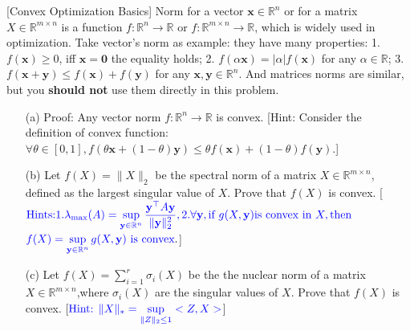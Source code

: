 \item {} [Convex Optimization Basics] Norm for a vector $\mathbf{x}\in\mathbb{R}^n$ or for a matrix $X\in\mathbb{R}^{m\times n}$ is a function $f:\mathbb{R}^{n}\rightarrow\mathbb{R}$ or $f:\mathbb{R}^{m\times n}\rightarrow\mathbb{R}$, which is widely used in optimization. Take vector's norm as example: they have many properties: 1. $f(\mathbf{x})\geq 0$, iff $\mathbf{x}=\mathbf{0}$ the equality holds; 2. $f(\alpha\mathbf{x})=|\alpha| f(\mathbf{x})$ for any $\alpha\in\mathbb{R}$; 3. $f(\mathbf{x}+\mathbf{y})\leq f(\mathbf{x})+f(\mathbf{y})$ for any $\mathbf{x},\mathbf{y}\in\mathbb{R}^n$. And matrices norms are similar, but you \textbf{should not} use them directly in this problem.
\begin{itemize}
    \item[(a)] Proof: Any vector norm $f:\mathbb{R}^{n}\rightarrow\mathbb{R}$ is convex. [Hint: Consider the definition of convex function: $\forall\theta\in[0,1], f(\theta\mathbf{x}+(1-\theta)\mathbf{y})\leq \theta f(\mathbf{x})+(1-\theta)f(\mathbf{y})$.] ~
    \item[(b)] Let $f(X) = \|X\|_2$ be the spectral norm of a matrix $X \in \mathbb{R}^{m \times n}$, defined as the largest singular value of $X$. Prove that $f(X)$ is convex. [$\textcolor{blue}{\text{Hints:} 1. \lambda_{\max}(A)=\sup\limits_{\mathbf{y}\in\mathbb{R}^n}\dfrac{\mathbf{y}^{\top}A\mathbf{y}}{\|\mathbf{y}\|_2^2}, 2. \forall\mathbf{y}, \text{if } g(X,\mathbf{y}) \text{is convex in } X, \text{then }}$ $\textcolor{blue}{f(X)=\sup\limits_{\mathbf{y}\in\mathbb{R}^n}g(X,\mathbf{y}) \text{ is convex}}.$] 
    \item[(c)] Let $f(X) = \sum\limits_{i=1}^{r} \sigma_i(X)$ be the the nuclear norm of  a matrix $X \in \mathbb{R}^{m \times n}$,where $\sigma_i(X)$ are the singular values of $X$. Prove that $f(X)$ is convex. [$\textcolor{blue}{\text{Hint: } \|X\|_* = \sup\limits_{\|Z\|_2 \leq 1} <Z,X>}$] 
\end{itemize}

\solution


